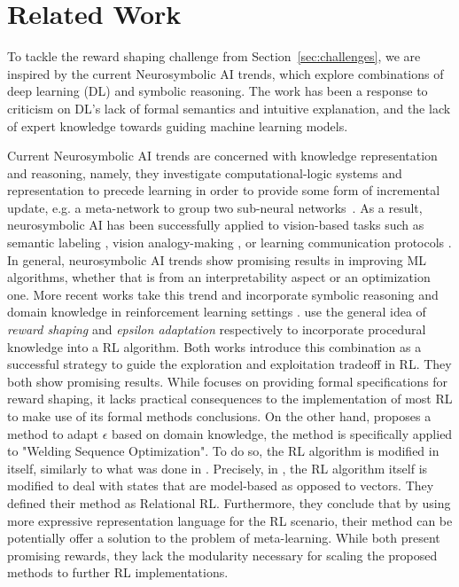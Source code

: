 \section{Related Work}
%
%
To tackle the reward shaping challenge from Section~\ref{sec:challenges}, we are
inspired by the current Neurosymbolic AI trends, which explore
combinations of deep learning (DL) and symbolic reasoning.
%
The work has been a response to criticism on DL's lack of formal
semantics and intuitive explanation, and the lack of expert knowledge
towards guiding machine learning models.

%
%
Current Neurosymbolic AI trends are concerned with knowledge representation and reasoning, namely, they investigate computational-logic systems 
and representation to precede learning in order to provide some form
of incremental update, e.g. a meta-network to group two sub-neural
networks~\cite{Besold2017NeuralSymbolicLA}.
As a result, neurosymbolic AI has been successfully applied to vision-based tasks such as semantic labeling \cite{vinyals2015, karpathy2015}, 
vision analogy-making \cite{Reed2015DeepVA}, or learning communication
protocols \cite{Foerster2016LearningTC}.
%
%
In general, neurosymbolic AI trends show promising results in improving ML algorithms, whether that is from 
an interpretability aspect or an optimization one. More recent works take this trend and incorporate symbolic reasoning and 
domain knowledge in reinforcement learning settings \cite{Driessens2010,Romero2020,achiam2017,marek2010}. \cite{marek2010,Romero2020} use the general idea of \textit{reward shaping} and \textit{epsilon adaptation} respectively 
to incorporate procedural knowledge into a RL algorithm. 
Both works introduce this combination as a successful strategy to guide the exploration and exploitation tradeoff in RL. They both show promising results. While 
\cite{marek2010} focuses on providing formal specifications for reward shaping, it lacks practical 
consequences to the implementation of most RL to make use of its formal methods conclusions. On the other hand, \cite{Romero2020} proposes a method to adapt $\epsilon$ based on domain knowledge, the method is specifically applied to "Welding Sequence Optimization".  
To do so, the RL algorithm is modified in itself, similarly to what was done in \cite{Driessens2010}. Precisely, in \cite{Driessens2010}, the RL algorithm itself is 
modified to deal with states that are model-based as opposed to vectors. They defined their method as Relational RL. 
Furthermore, they conclude that by using more expressive representation language for the RL scenario, their method can be potentially offer a solution to the problem of meta-learning. 
While \cite{Romero2020,Driessens2010} both present promising rewards, they lack the modularity necessary for scaling the proposed methods to further RL implementations. 

